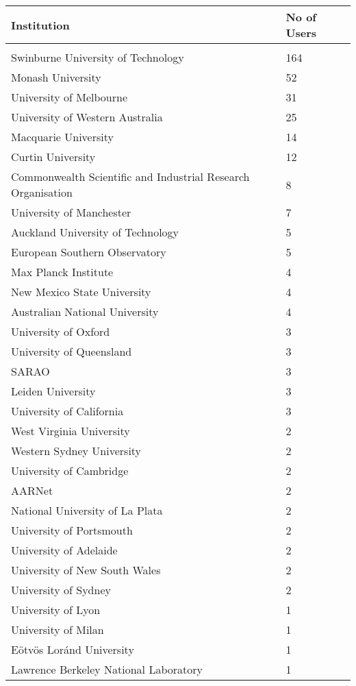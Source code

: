 \documentclass{article}%
\begin{document}
%
\begin{longtabu}{X[l] X[r]}%
\textbf{Institution}&\textbf{No of Users}\\%
\hline%
&\\%
Swinburne University of Technology&164\\%
\hline%
Monash University&52\\%
\hline%
University of Melbourne&31\\%
\hline%
University of Western Australia&25\\%
\hline%
Macquarie University&14\\%
\hline%
Curtin University&12\\%
\hline%
Commonwealth Scientific and Industrial Research Organisation&8\\%
\hline%
University of Manchester&7\\%
\hline%
Auckland University of Technology&5\\%
\hline%
European Southern Observatory&5\\%
\hline%
Max Planck Institute&4\\%
\hline%
New Mexico State University&4\\%
\hline%
Australian National University&4\\%
\hline%
University of Oxford&3\\%
\hline%
University of Queensland&3\\%
\hline%
SARAO&3\\%
\hline%
Leiden University&3\\%
\hline%
University of California&3\\%
\hline%
West Virginia University&2\\%
\hline%
Western Sydney University&2\\%
\hline%
University of Cambridge&2\\%
\hline%
AARNet&2\\%
\hline%
National University of La Plata&2\\%
\hline%
University of Portsmouth&2\\%
\hline%
University of Adelaide&2\\%
\hline%
University of New South Wales&2\\%
\hline%
University of Sydney&2\\%
\hline%
University of Lyon&1\\%
\hline%
University of Milan&1\\%
\hline%
Eötvös Loránd University&1\\%
\hline%
Lawrence Berkeley National Laboratory&1\\%

\end{longtabu}
\end{document}

